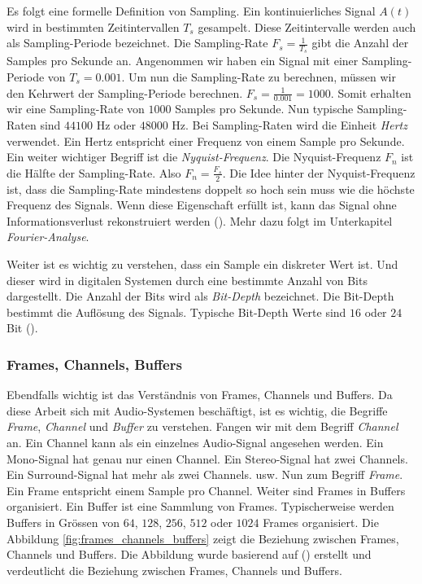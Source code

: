 \documentclass[11pt,a4paper]{article}
\begin{document}
\noindent \newline
Es folgt eine formelle Definition von Sampling. Ein kontinuierliches Signal \(A(t)\)
wird in bestimmten Zeitintervallen \(T_s\) gesampelt. Diese Zeitintervalle werden auch als
Sampling-Periode bezeichnet. Die Sampling-Rate \(F_s = \displaystyle\frac{1}{T_s}\) gibt die Anzahl
der Samples pro Sekunde an. Angenommen wir haben ein Signal mit einer Sampling-Periode
von \(T_s = 0.001\). Um nun die Sampling-Rate zu berechnen, müssen wir den Kehrwert der
Sampling-Periode berechnen. \(F_s = \displaystyle\frac{1}{0.001} = 1000\). Somit erhalten wir eine
Sampling-Rate von \(1000\) Samples pro Sekunde. Nun typische Sampling-Raten sind \(44100\) Hz
oder \(48000\) Hz. Bei Sampling-Raten wird die Einheit \textit{Hertz} verwendet. Ein Hertz entspricht
einer Frequenz von einem Sample pro Sekunde. Ein weiter wichtiger Begriff ist die
\textit{Nyquist-Frequenz}. Die Nyquist-Frequenz \(F_n\) ist die Hälfte der Sampling-Rate.
Also \(F_n = \displaystyle\frac{F_s}{2}\). Die Idee hinter der Nyquist-Frequenz ist, dass die
Sampling-Rate mindestens doppelt so hoch sein muss wie die höchste Frequenz des Signals. Wenn diese
Eigenschaft erfüllt ist, kann das Signal ohne Informationsverlust rekonstruiert werden
(\cite[Chapter~3.1]{tarr2018hackaudio}). Mehr dazu folgt im Unterkapitel
\textit{Fourier-Analyse}.

\noindent \newline
Weiter ist es wichtig zu verstehen, dass ein Sample ein diskreter Wert ist. Und dieser wird in
digitalen Systemen durch eine bestimmte Anzahl von Bits dargestellt. Die Anzahl der Bits wird
als \textit{Bit-Depth} bezeichnet. Die Bit-Depth bestimmt die Auflösung des Signals. Typische
Bit-Depth Werte sind \(16\) oder \(24\) Bit (\cite[p.10]{somberg2019audioapi}).

\subsubsection{Frames, Channels, Buffers}
Ebendfalls wichtig ist das Verständnis von Frames, Channels und Buffers. Da diese Arbeit sich mit
Audio-Systemen beschäftigt, ist es wichtig, die Begriffe \textit{Frame}, \textit{Channel} und
\textit{Buffer} zu verstehen. Fangen wir mit dem Begriff \textit{Channel} an. Ein Channel kann als
ein einzelnes Audio-Signal angesehen werden. Ein Mono-Signal hat genau nur einen Channel. Ein
Stereo-Signal hat zwei Channels. Ein Surround-Signal hat mehr als zwei Channels. usw.
Nun zum Begriff \textit{Frame}. Ein Frame entspricht einem Sample pro Channel. Weiter sind Frames
in Buffers organisiert. Ein Buffer ist eine Sammlung von Frames. Typischerweise werden Buffers in
Grössen von \(64\), \(128\), \(256\), \(512\) oder \(1024\) Frames organisiert. Die Abbildung
\ref{fig:frames_channels_buffers} zeigt die Beziehung zwischen Frames, Channels und Buffers.
Die Abbildung wurde basierend auf (\cite[p.10]{somberg2019audioapi}) erstellt und verdeutlicht die
Beziehung zwischen Frames, Channels und Buffers.
\end{document}
